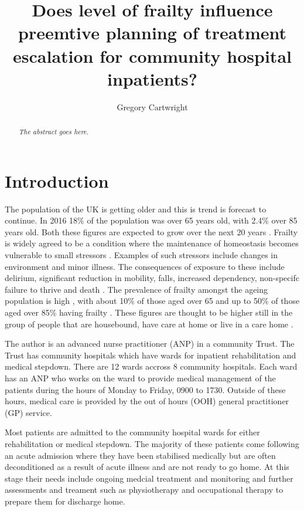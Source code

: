 \documentclass
[
	12pt,
	a4paper,
	oneside,
]{article}
\begin{document}
\author{Gregory Cartwright}
\title{Does level of frailty influence preemtive planning of treatment escalation 
	for community hospital inpatients?
}
\maketitle
\begin{abstract}
\emph{The abstract goes here.}
\end{abstract}
\section{Introduction}

The population of the UK is getting older and this is trend is forecast to continue.
In 2016 18\% of the population was over 65 years old, with 2.4\% over 85 years old.
Both these figures are expected to grow over the next 20 years \parencite{ons:17}.
Frailty is widely agreed to be a condition where the maintenance of homeostasis 
becomes vulnerable to 
small stressors \parencite{vellas:16}.  Examples of such stressors include changes in environment and minor
illness. The consequences of exposure to these include delirium, significant reduction in mobility,
falls, increased dependency, non-specifc failure to thrive and death 
\parencite{bgs:14,vellas:16,oliver:14}.
The prevalence of frailty amongst the ageing population is high \parencite{clegg:13},
with about 10\% of those aged over 65 and up to 50\% of
those aged over 85\% having frailty \parencite{bgs:14}. These figures
are thought to be higher still in the group of people that are housebound, 
have care at home or live in a care home \parencite{oliver:14}.

The author is an advanced nurse practitioner (ANP) in a community Trust.
The Trust has community hospitals which have wards for inpatient rehabilitation and
medical stepdown. There are 12 wards accross 8 community hospitals. Each ward has
an ANP who works on the ward to provide medical management of the patients during 
the hours of Monday to Friday, 0900 to 1730. Outside of these hours, medical care 
is provided by the out of hours (OOH) general practitioner (GP) service. 

Most patients are admitted to the community hospital wards for either rehabilitation
or medical stepdown. The majority of these patients come following an acute admission
where they have been stabilised medically but are often deconditioned as a result
of acute illness and are not ready to go home. At this stage their needs include 
ongoing medcial treatment and monitoring and further assessments and treament such 
as physiotherapy and occupational therapy to prepare them for discharge home.
\end{document}
